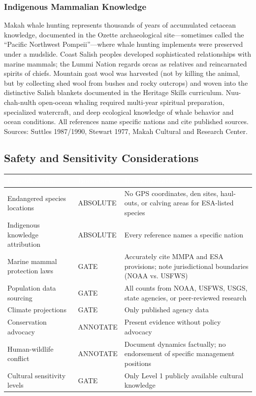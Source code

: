 \documentclass[11pt,letterpaper]{article}
\newcommand{\tableheader}[1]{\textbf{\sffamily\textcolor{white}{#1}}}
\begin{document}
\subsubsection{Indigenous Mammalian Knowledge}
Makah whale hunting represents thousands of years of accumulated cetacean knowledge, documented in the Ozette archaeological site---sometimes called the ``Pacific Northwest Pompeii''---where whale hunting implements were preserved under a mudslide. Coast Salish peoples developed sophisticated relationships with marine mammals; the Lummi Nation regards orcas as relatives and reincarnated spirits of chiefs. Mountain goat wool was harvested (not by killing the animal, but by collecting shed wool from bushes and rocky outcrops) and woven into the distinctive Salish blankets documented in the Heritage Skills curriculum. Nuu-chah-nulth open-ocean whaling required multi-year spiritual preparation, specialized watercraft, and deep ecological knowledge of whale behavior and ocean conditions. All references name specific nations and cite published sources. Sources: Suttles 1987/1990, Stewart 1977, Makah Cultural and Research Center.

\subsection{Safety and Sensitivity Considerations}

\begin{center}
\begin{tabularx}{\textwidth}{L{3.5cm}C{2cm}X}
\toprule
{}
\tableheader{Consideration} & \tableheader{Boundary} & \tableheader{Implementation} \\
\midrule
Endangered species locations & ABSOLUTE & No GPS coordinates, den sites, haul-outs, or calving areas for ESA-listed species \\
Indigenous knowledge attribution & ABSOLUTE & Every reference names a specific nation \\
Marine mammal protection laws & GATE & Accurately cite MMPA and ESA provisions; note jurisdictional boundaries (NOAA vs. USFWS) \\
Population data sourcing & GATE & All counts from NOAA, USFWS, USGS, state agencies, or peer-reviewed research \\
Climate projections & GATE & Only published agency data \\
Conservation advocacy & ANNOTATE & Present evidence without policy advocacy \\
Human-wildlife conflict & ANNOTATE & Document dynamics factually; no endorsement of specific management positions \\
Cultural sensitivity levels & GATE & Only Level 1 publicly available cultural knowledge \\
\bottomrule
\end{tabularx}
\end{center}
\end{document}
